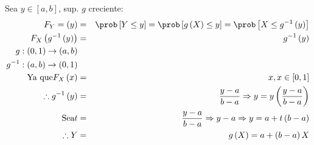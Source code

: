 \begin{Ejem}
Sea $y \in \left[a,b\right]$, sup. $g$ creciente:
\begin{eqnarray*}
F_{Y}= \left(y\right)&=&\prob \left[Y\leq y\right]= \prob\left[g\left(X\right)\leq y\right]= \prob\left[X\leq g^{-1}\left(y\right)\right]\\
F_{X}\left(g^{-1}\left(y\right)\right)&=& g^{-1}\left(y\right)\\
g:\left(0,1\right) \rightarrow \left(a,b\right)\\
g^{-1}:\left(a,b\right) \rightarrow \left(0,1\right)\\
\textrm {Ya que}  F_{X}\left(x\right) &=& x, x \in \left[0,1\right]\\
\therefore g^{-1}\left(y\right) &=& \frac{y-a}{b-a} \Rightarrow y = y\left(\frac{y-a}{b-a}\right)\\
\textrm{Sea}  t &=&\frac{y-a}{b-a}\Rightarrow y-a \Rightarrow y=a+t\left(b-a\right)\\
\therefore Y &=& g\left(X\right) = a+ \left(b-a\right)X
\end{eqnarray*}
\end{Ejem}




